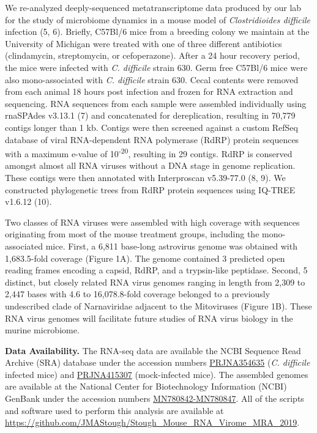 \documentclass[11pt,]{article}
\begin{document}
We re-analyzed deeply-sequenced metatranscriptome data produced by our
lab for the study of microbiome dynamics in a mouse model of
\emph{Clostridioides difficile} infection (5, 6). Briefly, C57Bl/6 mice
from a breeding colony we maintain at the University of Michigan were
treated with one of three different antibiotics (clindamycin,
streptomycin, or cefoperazone). After a 24 hour recovery period, the
mice were infected with \emph{C. difficile} strain 630. Germ free
C57Bl/6 mice were also mono-associated with \emph{C. difficile} strain
630. Cecal contents were removed from each animal 18 hours post
infection and frozen for RNA extraction and sequencing. RNA sequences
from each sample were assembled individually using rnaSPAdes v3.13.1 (7)
and concatenated for dereplication, resulting in 70,779 contigs longer
than 1 kb. Contigs were then screened against a custom RefSeq database
of viral RNA-dependent RNA polymerase (RdRP) protein sequences with a
maximum e-value of 10\textsuperscript{-20}, resulting in 29 contigs.
RdRP is conserved amongst almost all RNA viruses without a DNA stage in
genome replication. These contigs were then annotated with Interproscan
v5.39-77.0 (8, 9). We constructed phylogenetic trees from RdRP protein
sequences using IQ-TREE v1.6.12 (10).

Two classes of RNA viruses were assembled with high coverage with
sequences originating from most of the mouse treatment groups, including
the mono-associated mice. First, a 6,811 base-long astrovirus genome was
obtained with 1,683.5-fold coverage (Figure 1A). The genome contained 3
predicted open reading frames encoding a capsid, RdRP, and a
trypsin-like peptidase. Second, 5 distinct, but closely related RNA
virus genomes ranging in length from 2,309 to 2,447 bases with 4.6 to
16,078.8-fold coverage belonged to a previously undescribed clade of
Narnaviridae adjacent to the Mitoviruses (Figure 1B). These RNA virus
genomes will facilitate future studies of RNA virus biology in the
murine microbiome.

\textbf{Data Availability.} The RNA-seq data are available the NCBI
Sequence Read Archive (SRA) database under the accession numbers
\href{https://www.ncbi.nlm.nih.gov/bioproject/354635}{PRJNA354635}
(\emph{C. difficile} infected mice) and
\href{https://www.ncbi.nlm.nih.gov/bioproject/415307}{PRJNA415307}
(mock-infected mice). The assembled genomes are available at the
National Center for Biotechnology Information (NCBI) GenBank under the
accession numbers
\href{https://www.ncbi.nlm.nih.gov/nuccore/?term=MN780842+MN780843+MN780844+MN780845+MN780846+MN780847}{MN780842-MN780847}.
All of the scripts and software used to perform this analysis are
available at
\url{https://github.com/JMAStough/Stough_Mouse_RNA_Virome_MRA_2019}.
\end{document}
